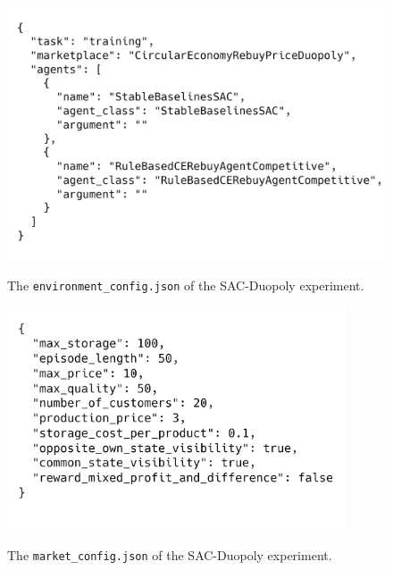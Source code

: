 \begin{figure}[ht]
	\includegraphics[width = \textwidth]{images/configs/SACDuopolyEnvironment.png}\\
	\caption{The \texttt{environment\_config.json} of the SAC-Duopoly experiment.}\label{fig:SACDuopolyConfigEnvironment}
\end{figure}

\begin{figure}[!]
	\includegraphics[width = 0.9\textwidth]{images/configs/SACDuopolyMarket.png}\\
	\caption{The \texttt{market\_config.json} of the SAC-Duopoly experiment.}\label{fig:SACDuopolyConfigMarket}
\end{figure}

